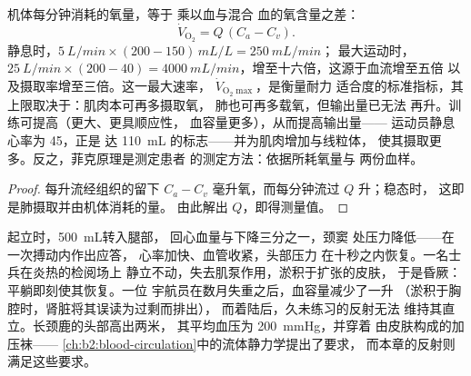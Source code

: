 \begin{theorem}[氧的输送与菲克原理]\label{thm:b2:blood-pressure:fick}
机体每分钟消耗的氧量，等于
乘以血与混合
血的氧含量之差：
\[
\dot V_{\mathrm{O_2}} = Q\,(C_a - C_v).
\]
静息时，$\qty{5}{L/min}\times(200 - 150)\,\unit{mL/L} = \qty{250}{mL/min}$；
最大运动时，$\qty{25}{L/min}\times(200 - 40) =
\qty{4000}{mL/min}$，增至十六倍，这源于血流增至五倍
以及摄取率增至三倍。这一最大速率，
$\dot V_{\mathrm{O_2}\max}$，是衡量耐力
适合度的标准指标，其上限取决于：肌肉本可再多摄取氧，
肺也可再多载氧，但输出量已无法
再升。训练可提高（更大、更具顺应性，
血容量更多），从而提高输出量——
运动员静息心率为 45，正是
达 \qty{110}{mL} 的标志——并为肌肉增加与线粒体，
使其摄取更多。反之，菲克原理是测定患者
的测定方法：依据所耗氧量与
两份血样。
\end{theorem}
\begin{proof}
每升流经组织的留下 $C_a - C_v$
毫升氧，而每分钟流过 $Q$ 升；稳态时，
这即是肺摄取并由机体消耗的量。
由此解出 $Q$，即得测量值。
\end{proof}

\begin{example}[起立、晕厥与宇航员]\label{ex:b2:blood-pressure:standing}
起立时，\qty{500}{mL}转入腿部，
回心血量与下降三分之一，颈窦
处压力降低——在一次搏动内作出应答，
心率加快、血管收紧，头部压力
在十秒之内恢复。一名士兵在炎热的检阅场上
静立不动，失去肌泵作用，淤积于扩张的皮肤，
于是昏厥：平躺即刻使其恢复。一位
宇航员在数月失重之后，血容量减少了一升
（淤积于胸腔时，肾脏将其误读为过剩而排出），
而着陆后，久未练习的反射无法
维持其直立。长颈鹿的头部高出两米，
其平均血压为 \qty{200}{mmHg}，并穿着
由皮肤构成的加压袜——
\cref{ch:b2:blood-circulation}中的流体静力学提出了要求，
而本章的反射则满足这些要求。
\end{example}


